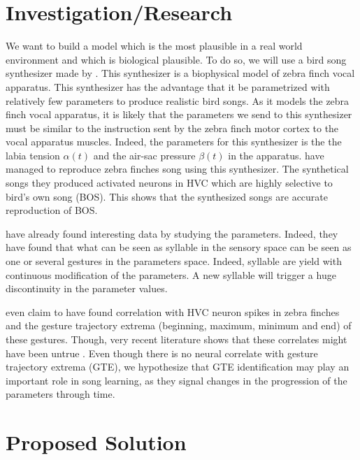 \documentclass[a4paper, 11pt]{article}
\begin{document}
\section*{Investigation/Research}

We want to build a model which is the most plausible in a real world environment
and which is biological plausible. To do so, we will use a bird song synthesizer
made by \textcite{boari_automatic_2015}. This synthesizer is a biophysical model
of zebra finch vocal apparatus. This synthesizer has the advantage that it be
parametrized with relatively few parameters to produce realistic bird songs. As
it models the zebra finch vocal apparatus, it is likely that the parameters we
send to this synthesizer must be similar to the instruction sent by the zebra
finch motor cortex to the vocal apparatus muscles. Indeed, the parameters for
this synthesizer is the the labia tension \(\alpha(t)\) and the air-sac pressure
\(\beta(t)\) in the apparatus.
\textcite{amador_elemental_2013,boari_automatic_2015} have managed to reproduce
zebra finches song using this synthesizer. The synthetical songs they produced
activated neurons in HVC which are highly selective to bird's own song (BOS).
This shows that the synthesized songs are accurate reproduction of BOS.

\textcite{amador_low_2014,boari_automatic_2015} have already found interesting
data by studying the parameters. Indeed, they have found that what can be seen
as syllable in the sensory space can be seen as one or several gestures in the
parameters space. Indeed, syllable are yield with continuous modification of the
parameters. A new syllable will trigger a huge discontinuity in the parameter
values.

\textcite{amador_elemental_2013} even claim to have found correlation with HVC
neuron spikes in zebra finches and the gesture trajectory extrema (beginning,
maximum, minimum and end) of these gestures. Though, very recent literature
shows that these correlates might have been untrue
\parencite{lynch_rhythmic_2016,picardo_population-level_2016}. Even though there
is no neural correlate with gesture trajectory extrema (GTE), we hypothesize
that GTE identification may play an important role in song learning, as they
signal changes in the progression of the parameters through time.

\section*{Proposed Solution}
\end{document}
